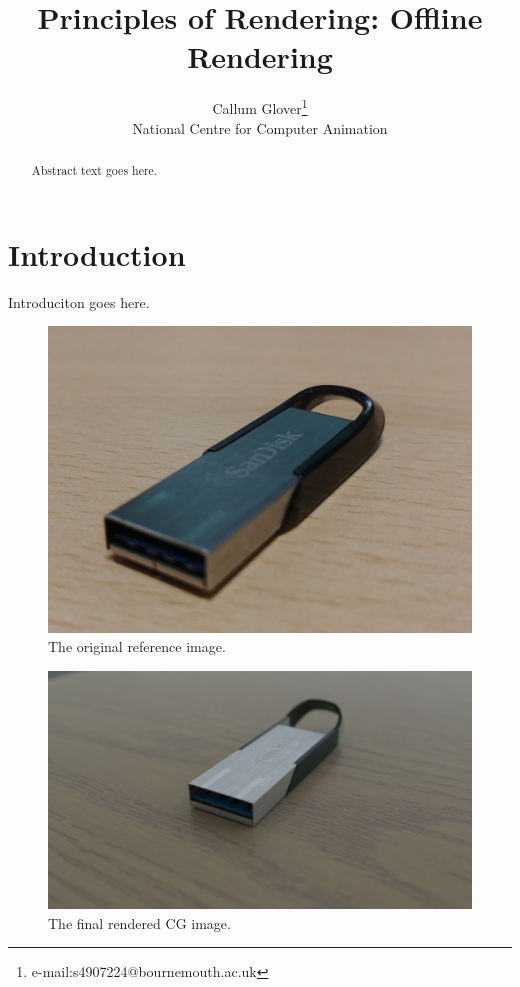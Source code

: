\documentclass[]{acmsiggraph}
\title{Principles of Rendering: Offline Rendering}
\author{Callum Glover\thanks{e-mail:s4907224@bournemouth.ac.uk}\\National Centre for Computer Animation}
\begin{document}

\maketitle


\begin{abstract}
Abstract text goes here.
\end{abstract}

\section{Introduction} \label{sec:introduction}
Introduciton goes here.

\begin{figure}[htbp]\centering
 \includegraphics[width=0.75\linewidth]{images/photoref.jpg}
 \caption{\label{fig:reference}The original reference image.}
\end{figure}

\begin{figure}[htbp]\centering
 \includegraphics[width=0.75\linewidth]{images/sd.jpg}
 \caption{\label{fig:CG}The final rendered CG image.}
\end{figure}
\end{document}
